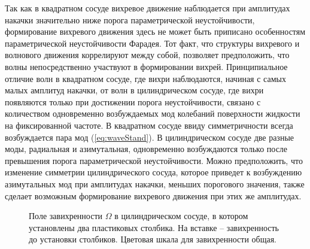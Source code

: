 Так как в квадратном сосуде вихревое движение наблюдается при амплитудах накачки значительно ниже порога параметрической неустойчивости, формирование вихревого движения здесь не может быть приписано особенностям параметрической неустойчивости Фарадея. Тот факт, что структуры вихревого и волнового движения коррелируют между собой, позволяет предположить, что волны непосредственно участвуют в формировании вихрей. Принципиальное отличие волн в квадратном сосуде, где вихри наблюдаются, начиная с самых малых амплитуд накачки, от волн в цилиндрическом сосуде, где вихри появляются только при достижении порога неустойчивости, связано с количеством одновременно возбуждаемых мод колебаний поверхности жидкости на фиксированной частоте. В квадратном сосуде ввиду симметричности всегда возбуждается пара мод (\ref{eq:waveStand}). В цилиндрическом сосуде две разные моды, радиальная и азимутальная, одновременно возбуждаются только после превышения порога параметрической неустойчивости. Можно предположить, что изменение симметрии цилиндрического сосуда, которое приведет к возбуждению азимутальных мод при амплитудах накачки, меньших порогового значения, также сделает возможным формирование вихревого движения при этих же амплитудах.

\begin{figure}[ht]
  \begin{minipage}[ht]{0.49\linewidth}
  \end{minipage}
  \hfill
  \begin{minipage}[ht]{0.49\linewidth}
  \end{minipage}
  \caption{Поле завихренности $\Omega$ в цилиндрическом сосуде, в котором установлены два пластиковых столбика. На вставке – завихренность до установки столбиков. Цветовая шкала для завихренности общая.}
  \label{img:vort_st}  
\end{figure}

